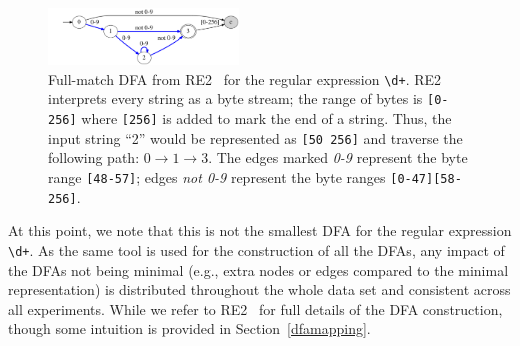 \begin{figure}[t]
	\centering
	\includegraphics[width=0.45\textwidth]{figures/digits}
	\vspace{-12pt}
	\caption{Full-match DFA from RE2~\cite{re2} for the regular expression {\tt \textbackslash d+}. 
	RE2  interprets every string as a byte stream; the range of bytes is {\tt [0-256]} where {\tt [256]} is added to mark the end of a string. Thus, the input string ``2'' would be represented as {\tt [50 256]} and traverse the following path: $0 \rightarrow 1 \rightarrow 3$. 
	The edges marked \emph{0-9} represent the byte range {\tt [48-57]}; edges \emph{not 0-9} represent the byte ranges {\tt [0-47][58-256]}. }
	\label{fig:static}    
	\vspace{-12pt}
\end{figure}


At this point, we note that this is not the smallest DFA for the regular expression \verb!\d+!.  
As the same tool is used for the construction of all the  DFAs, any impact of the DFAs not being minimal  (e.g., extra nodes or edges compared to the minimal representation) is distributed throughout the whole data set and consistent across all experiments. 
While we refer to RE2~\cite{re2} for full details of the DFA construction, though some intuition is provided in Section~\ref{dfamapping}. 




